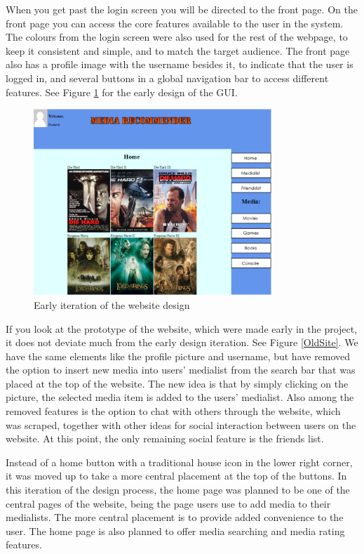 When you get past the login screen you will be directed to the front page. On the front page you can access the core features available to the user in the system. The colours from the login screen were also used for the rest of the webpage, to keep it consistent and simple, and to match the target audience. The front page also has a profile image with the username besides it, to indicate that the user is logged in, and several buttons in a global navigation bar to access different features. See Figure \ref{CurrSite} for the early design of the GUI.

\begin{figure}[htb]
\centering
\includegraphics[width=0.8\textwidth]{Images/CurrSite.png}
\caption{Early iteration of the website design}
\label{CurrSite}
\end{figure}


If you look at the prototype of the website, which were made early in the project, it does not deviate much from the early design iteration. See Figure \ref{OldSite}. We have the same elements like the profile picture and username, but have removed the option to insert new media into users' medialist from the search bar that was placed at the top of the website. The new idea is that by simply clicking on the picture, the selected media item is added to the users’ medialist. Also among the removed features is the option to chat with others through the website, which was scraped, together with other ideas for social interaction between users on the website. At this point, the only remaining social feature is the friends list. 

Instead of a home button with a traditional house icon in the lower right corner, it was moved up to take a more central placement at the top of the buttons. In this iteration of the design process, the home page was planned to be one of the central pages of the website, being the page users use to add media to their medialists. The more central placement is to provide added convenience to the user. The home page is also planned to offer media searching and media rating features.


